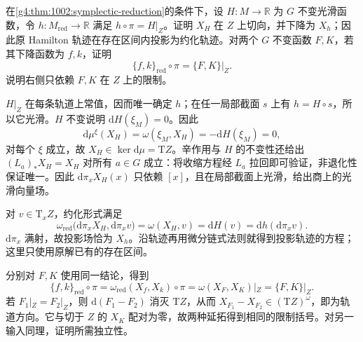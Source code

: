 \begin{exercise}\label{g4:ex:1002:reduced-hamiltonian}
	在\cref{g4:thm:1002:symplectic-reduction}的条件下，设 \(H:M\to\mathbb R\) 为 \(G\) 不变光滑函数，令 \(h:M_{\mathrm{red}}\to\mathbb R\) 满足 \(h\circ\pi=H|_Z\)。证明 \(X_H\) 在 \(Z\) 上切向，并下降为 \(X_h\)；因此原 Hamilton 轨迹在存在区间内投影为约化轨迹。对两个 \(G\) 不变函数 \(F,K\)，若其下降函数为 \(f,k\)，证明
	\[
		\{f,k\}_{\mathrm{red}}\circ\pi=\{F,K\}|_Z.
	\]
	说明右侧只依赖 \(F,K\) 在 \(Z\) 上的限制。
\end{exercise}
\begin{solution}
	\(H|_Z\) 在每条轨道上常值，因而唯一确定 \(h\)；在任一局部截面 \(s\) 上有 \(h=H\circ s\)，所以它光滑。\(H\) 不变说明 \(\mathrm{d}H(\xi_M)=0\)。因此
	\[
		\mathrm{d}\mu^\xi(X_H)
		=\omega(\xi_M,X_H)
		=-\mathrm{d}H(\xi_M)=0,
	\]
	对每个 \(\xi\) 成立，故 \(X_H\in\ker\mathrm{d}\mu=\mathrm{T}Z\)。辛作用与 \(H\) 的不变性还给出 \((L_a)_*X_H=X_H\) 对所有 \(a\in G\) 成立：将收缩方程经 \(L_a\) 拉回即可验证，非退化性保证唯一。因此 \(\mathrm{d}\pi_xX_H(x)\) 只依赖 \([x]\)，且在局部截面上光滑，给出商上的光滑向量场。

	对 \(v\in\mathrm{T}_xZ\)，约化形式满足
	\[
		\omega_{\mathrm{red}}\bigl(\mathrm{d}\pi_xX_H,\mathrm{d}\pi_xv\bigr)
		=\omega(X_H,v)=\mathrm{d}H(v)
		=\mathrm{d}h(\mathrm{d}\pi_xv).
	\]
	\(\mathrm{d}\pi_x\) 满射，故投影场恰为 \(X_h\)。沿轨迹再用微分链式法则就得到投影轨迹的方程；这里只使用原解已有的存在区间。

	分别对 \(F,K\) 使用同一结论，得到
	\[
		\{f,k\}_{\mathrm{red}}\circ\pi
		=\omega_{\mathrm{red}}(X_f,X_k)\circ\pi
		=\omega(X_F,X_K)|_Z=\{F,K\}|_Z.
	\]
	若 \(F_1|_Z=F_2|_Z\)，则 \(\mathrm{d}(F_1-F_2)\) 消灭 \(\mathrm{T}Z\)，从而 \(X_{F_1}-X_{F_2}\in(\mathrm{T}Z)^\omega\)，即为轨道方向。它与切于 \(Z\) 的 \(X_K\) 配对为零，故两种延拓得到相同的限制括号。对另一输入同理，证明所需独立性。
\end{solution}

